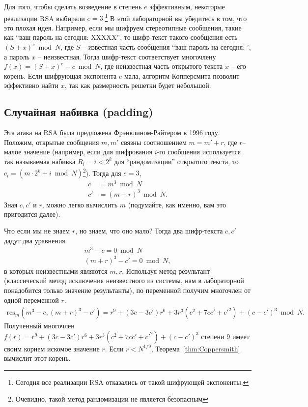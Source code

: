 \documentclass[11pt]{exam}
\theoremstyle{definition}
\begin{document}
{	Для того, чтобы сделать возведение в степень $e$ эффективным, некоторые реализации RSA выбирали $e=3$.\footnote{Сегодня все реализации RSA отказались от такой шифрующей экспоненты.} В этой лабораторной вы убедитесь в том, что это плохая идея. Например, если мы шифруем стереотипные сообщения, такие как ``ваш пароль на сегодня: XXXXX'', то шифр-текст такого сообщения есть $(S+x)^e \bmod N$, где $S$ -- известная часть сообщения ``ваш пароль на сегодня: ', а пароль $x$ -- неизвестная. Тогда шифр-текст соответствует многочлену $f(x) = (S+x)^e - c \bmod N$, где неизвестная часть открытого текста $x$ -- его корень. Если шифрующая экспонента $e$ мала, алгоритм Копперсмита позволит эффективно найти $x$, так как размерность решетки будет небольшой. 
	
	 
	\subsection{Случайная набивка (padding)}
	
	Эта атака на RSA была предложена Фрэнклином-Райтером в 1996 году.  Положим, открытые сообщения $m,m'$ связны соотношением $m = m'+r$, где $r$-- малое значение (например, если для шифрования $i$-го сообщения используется так называемая набивка $R_i = i < 2^k$ для ``рандомизации'' открытого текста, то $c_i = (m\cdot 2^k + i \bmod N)$\footnote{Очевидно, такой метод рандомизации не является безопасным}). Тогда для $e = 3$,
	\begin{align*}
		c &= m^3 \bmod N \\
		c' &=(m+r)^3 \bmod N.
	\end{align*}
	Зная $c, c'$ и $r$, можно легко вычислить $m$ (подумайте, как именно, вам это пригодится далее).
	
	Что если мы не знаем $r$, но знаем, что оно мало? Тогда два шифр-текста $c, c'$ дадут два уравнения 
	\begin{align*}
	m^3 - c = 0 \bmod N \\
	(m+r)^3 - c' = 0\bmod N,
	\end{align*}
	в которых неизвестными являются $m,r$. Используя метод результант (классический метод исключения неизвестного из системы, нам в лабораторной понадобится только значение результанты), по переменной получим многочлен от одной переменной $r$.
	\begin{align*}
		\text{res}_m(m^3 - c, (m+r)^3 - c' ) = r^9 + (3c - 3c')r^6 + 3r^3(c^2 + 7cc'+c'^2) + (c-c')^3 \bmod N.
	\end{align*}
	Полученный многочлен $f(r)=r^9 + (3c - 3c')r^6 + 3r^3(c^2 + 7cc'+c'^2) + (c-c')^3 $ степени 9 имеет своим корнем искомое значение $r$. Если $r < N^{1/9}$, Теорема~\ref{thm:Coppersmith} вычислит этот корень.
}
\end{document}
